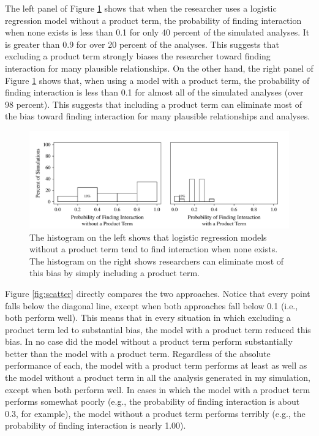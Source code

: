 \documentclass[12pt]{article}
\begin{document}
The left panel of Figure \ref{fig:hist} shows that when the researcher uses a logistic regression model without a product term, the probability of finding interaction when none exists is less than 0.1  for  only 40 percent of the simulated analyses. It is greater than 0.9 for over 20 percent of the analyses. This suggests that excluding a product term strongly biases the researcher toward finding interaction for many plausible relationships. On the other hand, the right panel of Figure  \ref{fig:hist} shows that, when using a model with a product term, the probability of finding interaction is less than 0.1  for almost all of the simulated analyses  (over 98 percent).
This suggests that including a product term can eliminate most of the bias toward finding interaction for many plausible relationships and analyses.

\begin{figure}[h]
\begin{center}
\includegraphics[scale = .7]{fig/fig-hist.pdf}
\end{center}\caption{The histogram on the left shows that logistic regression models without a product term tend to find interaction when none exists. The histogram on the right shows researchers can eliminate most of this bias by simply including a product term.}\label{fig:hist}
\end{figure}

Figure \ref{fig:scatter} directly compares the two approaches. Notice that every point falls below the diagonal line, except when both approaches fall below 0.1 (i.e., both perform well). This means that in every situation in which excluding a product term led to substantial bias, the model with a product term reduced this bias. In no case did the model without a product term perform substantially better than the model with a product term. Regardless of the absolute performance of each, the model with a product term performs at least as well as the model without a product term in all the analysis generated in my simulation, except when both perform well. In cases in which the model with a product term performs somewhat poorly (e.g., the probability of finding interaction is about 0.3, for example), the model without a product term performs terribly (e.g., the probability of finding interaction is nearly 1.00).
 
\end{document}
